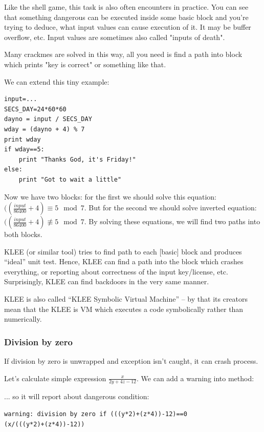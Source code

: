Like the shell game, this task is also often encounters in practice.
You can see that something dangerous can be executed inside some basic block and you're trying to deduce,
what input values can cause execution of it.
It may be buffer overflow, etc.
Input values are sometimes also called "inputs of death".

Many crackmes are solved in this way, all you need is find a path into block which prints "key is correct"
or something like that.

We can extend this tiny example:

\begin{lstlisting}
input=...
SECS_DAY=24*60*60
dayno = input / SECS_DAY
wday = (dayno + 4) % 7
print wday
if wday==5:
    print "Thanks God, it's Friday!"
else:
    print "Got to wait a little"
\end{lstlisting}

Now we have two blocks: for the first we should solve this equation: $((\frac{input}{86400}+4) \equiv 5 \mod 7$.
But for the second we should solve inverted equation: $((\frac{input}{86400}+4) \not\equiv 5 \mod 7$.
By solving these equations, we will find two paths into both blocks.

KLEE (or similar tool) tries to find path to each [basic] block and produces ``ideal'' unit test.
Hence, KLEE can find a path into the block which crashes everything, or reporting about correctness of the input
key/license, etc.
Surprisingly, KLEE can find backdoors in the very same manner.

KLEE is also called ``KLEE Symbolic Virtual Machine'' -- by that its creators mean that the KLEE is VM which executes a code symbolically rather than numerically.

\subsubsection{Division by zero}

If division by zero is unwrapped and exception isn't caught, it can crash process.

Let's calculate simple expression $\frac{x}{2y + 4z - 12}$.
We can add a warning into  method:



... so it will report about dangerous condition:

\begin{lstlisting}
warning: division by zero if (((y*2)+(z*4))-12)==0
(x/(((y*2)+(z*4))-12))
\end{lstlisting}

